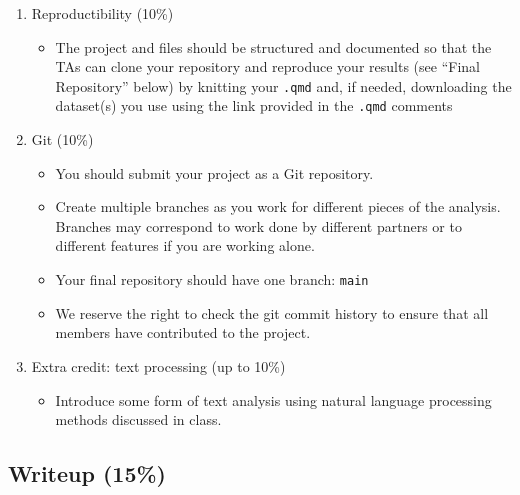 \documentclass[
  letterpaper,
  DIV=11,
  numbers=noendperiod]{scrartcl}
\providecommand{\tightlist}{%
  \setlength{\itemsep}{0pt}\setlength{\parskip}{0pt}}\usepackage{longtable,booktabs,array}
\begin{document}
\begin{enumerate}
\def\labelenumi{\arabic{enumi}.}
\setcounter{enumi}{3}
\tightlist
\item
  Reproductibility (10\%)

  \begin{itemize}
  \tightlist
  \item
    The project and files should be structured and documented so that
    the TAs can clone your repository and reproduce your results (see
    ``Final Repository'' below) by knitting your \texttt{.qmd} and, if
    needed, downloading the dataset(s) you use using the link provided
    in the \texttt{.qmd} comments
  \end{itemize}
\item
  Git (10\%)

  \begin{itemize}
  \tightlist
  \item
    You should submit your project as a Git repository.
  \item
    Create multiple branches as you work for different pieces of the
    analysis. Branches may correspond to work done by different partners
    or to different features if you are working alone.
  \item
    Your final repository should have one branch: \texttt{main}
  \item
    We reserve the right to check the git commit history to ensure that
    all members have contributed to the project.
  \end{itemize}
\item
  Extra credit: text processing (up to 10\%)

  \begin{itemize}
  \tightlist
  \item
    Introduce some form of text analysis using natural language
    processing methods discussed in class.
  \end{itemize}
\end{enumerate}

\subsection{Writeup (15\%)}\label{writeup-15}
\end{document}
